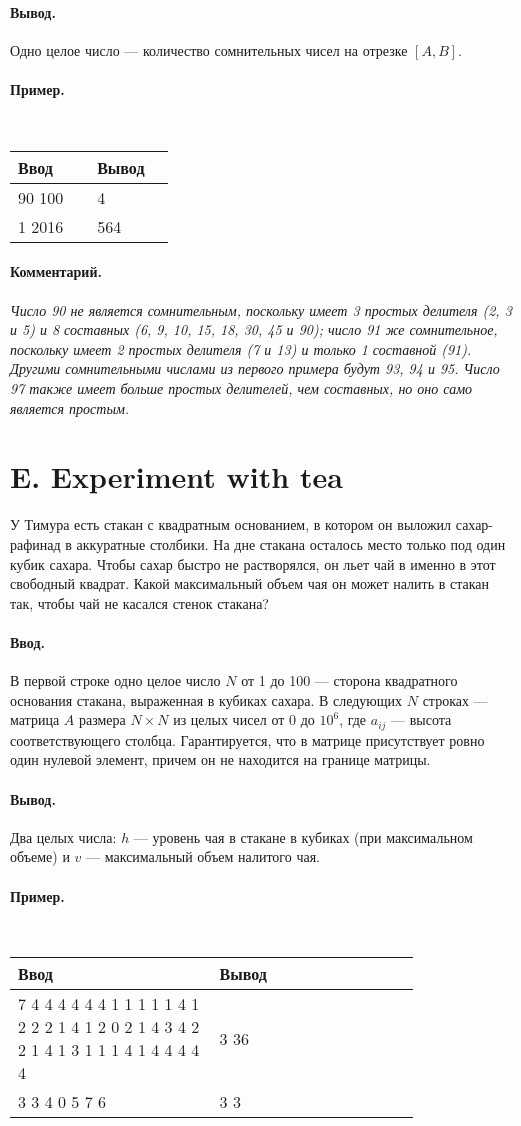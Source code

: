 \documentclass[10pt, a5paper]{article}
\newcommand{\informat}[1]
{
	\paragraph{Ввод.\\} #1
}
\newcommand{\outformat}[1]
{
	\paragraph{Вывод.\\} #1
}
\newcommand{\examplee}[4]
{
	\paragraph{Пример.\\}
	{\tt
	\begin{tabular}{|p{0.4\linewidth}|p{0.4\linewidth}|}
	\hline
	Ввод 	& Вывод  	\\
	\hline
	#1 		& #2 		\\
	\hline
	#3		& #4		\\
	\hline
	\end{tabular}
	}
}
\newcommand{\excomm}[1]
{
	\paragraph{Комментарий. \\}
	\textit{#1}
}
\begin{document}
\outformat{Одно целое число --- количество сомнительных чисел на отрезке $[A, B]$.}

\examplee{90 100}{4}{1 2016}{564}

\excomm{Число 90 не является сомнительным, поскольку имеет 3 простых делителя (2, 3 и 5) и 8 составных (6, 9, 10, 15, 18, 30, 45 и 90); число 91 же сомнительное, поскольку имеет 2 простых делителя (7 и 13) и только 1 составной (91). Другими сомнительными числами из первого примера будут 93, 94 и 95. Число 97 также имеет больше простых делителей, чем составных, но оно само является простым.}



\section*{E. Experiment with tea}

У Тимура есть стакан с квадратным основанием, в котором он выложил сахар-рафинад в аккуратные столбики. На дне стакана осталось место только под один кубик сахара. Чтобы сахар быстро не растворялся, он льет чай в именно в этот свободный квадрат. Какой максимальный объем чая он может налить в стакан так, чтобы чай не касался стенок стакана?



\informat{В первой строке одно целое число $N$ от 1 до 100 --- сторона квадратного основания стакана, выраженная в кубиках сахара. \newline
В следующих $N$ строках ---  матрица $A$ размера $N \times N$ из целых чисел от 0 до $10^6$, где $a_{ij}$ --- высота соответствующего столбца. Гарантируется, что в матрице присутствует ровно один нулевой элемент, причем он не находится на границе матрицы.}

\outformat{Два целых числа: $h$ --- уровень чая в стакане в кубиках (при максимальном объеме) и $v$ --- максимальный объем налитого чая.}

\examplee{7 \newline
4 4 4 4 4 4 4  \newline
4 1 1 1 1 1 4  \newline
4 1 2 2 2 1 4  \newline
4 1 2 0 2 1 4  \newline
4 3 4 2 2 1 4  \newline
1 1 3 1 1 1 4  \newline
1 1 4 4 4 4 4}{3 36}
{3 \newline
2 3 4 \newline
9 0 5 \newline
8 7 6}{3 3}
\end{document}
